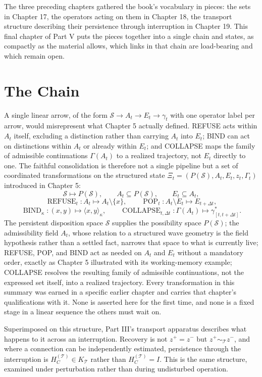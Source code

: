 \documentclass[11pt]{book}
\begin{document}
The three preceding chapters gathered the book's vocabulary in pieces: the sets in Chapter 17, the operators acting on them in Chapter 18, the transport structure describing their persistence through interruption in Chapter 19. This final chapter of Part V puts the pieces together into a single chain and states, as compactly as the material allows, which links in that chain are load-bearing and which remain open.

\section*{The Chain}

A single linear arrow, of the form $\mathcal S\to A_t\to E_t\to\gamma_t$ with one operator label per arrow, would misrepresent what Chapter 5 actually defined. REFUSE acts within $A_t$ itself, excluding a distinction rather than carrying $A_t$ into $E_t$; BIND can act on distinctions within $A_t$ or already within $E_t$; and COLLAPSE maps the family of admissible continuations $\Gamma(A_t)$ to a realized trajectory, not $E_t$ directly to one. The faithful consolidation is therefore not a single pipeline but a set of coordinated transformations on the structured state $\Xi_t=(P(\mathcal S),A_t,E_t,z_t,\Gamma_t)$ introduced in Chapter 5:
\[
\mathcal S\longmapsto P(\mathcal S),
\qquad
A_t\subseteq P(\mathcal S),
\qquad
E_t\subseteq A_t,
\]
\[
\operatorname{REFUSE}_t:
A_t\longmapsto A_t\setminus\{x\},
\qquad
\operatorname{POP}_t:
A_t\setminus E_t\longmapsto E_{t+\Delta t},
\]
\[
\operatorname{BIND}_\kappa:
(x,y)\longmapsto\langle x,y\rangle_\kappa,
\qquad
\operatorname{COLLAPSE}_{t,\Delta t}:
\Gamma(A_t)\longmapsto\gamma^{*}_{[t,t+\Delta t]}.
\]
The persistent disposition space $\mathcal S$ supplies the possibility space $P(\mathcal S)$; the admissibility field $A_t$, whose relation to a structured wave geometry is the field hypothesis rather than a settled fact, narrows that space to what is currently live; REFUSE, POP, and BIND act as needed on $A_t$ and $E_t$ without a mandatory order, exactly as Chapter 5 illustrated with its working-memory example; COLLAPSE resolves the resulting family of admissible continuations, not the expressed set itself, into a realized trajectory. Every transformation in this summary was earned in a specific earlier chapter and carries that chapter's qualifications with it. None is asserted here for the first time, and none is a fixed stage in a linear sequence the others must wait on.

Superimposed on this structure, Part III's transport apparatus describes what happens to it across an interruption. Recovery is not $z^{+}=z^{-}$ but $z^{+}\sim_{\mathcal T}z^{-}$, and where a connection can be independently estimated, persistence through the interruption is $H_C^{(\mathcal T)}\in K_{\mathcal T}$ rather than $H_C^{(\mathcal T)}=I$. This is the same structure, examined under perturbation rather than during undisturbed operation.
\end{document}
